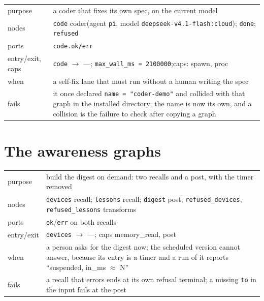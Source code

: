 \begin{center}\footnotesize
\begin{tabular}{@{}>{\raggedright\arraybackslash}p{}>{\raggedright\arraybackslash}p{}@{}}
  purpose & a coder that fixes its own spec, on the current model \\
  nodes & \texttt{code} coder(agent \texttt{pi}, model
    \texttt{deepseek-v4.1-flash:cloud}); \texttt{done}; \texttt{refused} \\
  ports & \texttt{code.ok/err} \\
  entry/exit, caps & \texttt{code} $\to$ ---; \texttt{max\_wall\_ms = 2100000};\newline caps: spawn, proc \\
  when & a self-fix lane that must run without a human writing the spec \\
  fails & it once declared \texttt{name = "coder-demo"} and collided with that graph in the
    installed directory; the name is now its own, and a collision is the failure to check
    after copying a graph \\
\end{tabular}
\end{center}

\section{The awareness graphs}

\begin{center}\footnotesize
\begin{tabular}{@{}>{\raggedright\arraybackslash}p{}>{\raggedright\arraybackslash}p{}@{}}
  purpose & build the digest on demand: two recalls and a post, with the timer removed \\
  nodes & \texttt{devices} recall; \texttt{lessons} recall; \texttt{digest} post;
    \texttt{refused\_devices}, \texttt{refused\_lessons} transforms \\
  ports & \texttt{ok}/\texttt{err} on both recalls \\
  entry/exit & \texttt{devices} $\to$ ---; caps memory\_read, post \\
  when & a person asks for the digest now; the scheduled version cannot answer, because its
    entry is a timer and a run of it reports \enquote{suspended, in\_ms $\approx$ N} \\
  fails & a recall that errors ends at its own refusal terminal; a missing
    \texttt{to} in the input fails at the post \\
\end{tabular}
\end{center}

